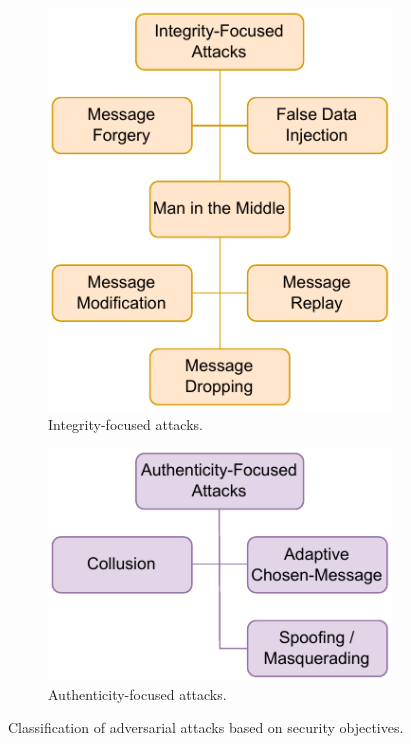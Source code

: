 \begin{figure}
\begin{subfigure}[t]{0.295\linewidth}
        \includegraphics[width=\linewidth]{figures/attacks_integrity.drawio.pdf}
        \caption{Integrity-focused attacks.}
        \label{fig:attacks_integrity}
    \end{subfigure}
    \hfill
    \begin{subfigure}[t]{0.30\linewidth}
        \centering
        \includegraphics[width=\linewidth]{figures/attacks_authenticity.drawio.pdf}
        \caption{Authenticity-focused attacks.}
        \label{fig:attacks_authenticity}
    \end{subfigure}
    \caption{Classification of adversarial attacks based on security objectives.}
    \label{fig:attack_classification}
\end{figure}

